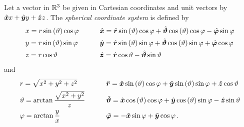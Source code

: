 \begin{definition}
	\label{def:sph_coords}
	Let a vector in $\mathbb{R}^3$ be given in Cartesian coordinates and unit vectors
	by $\uv{x}x + \uv{y}y + \uv{z}z$.
	The \emph{spherical coordinate system} is defined by 
	\begin{subequations}
		\begin{align}
			&x = r \sin \left(\vartheta\right) \cos \varphi
			\qquad
			&&\uv{x} = \uv{r} \sin\left(\vartheta\right) \cos \varphi +
			\uv{\vartheta} \cos\left(\vartheta\right) \cos \varphi -
			\uv{\varphi} \sin \varphi \\
			&y = r \sin \left(\vartheta\right) \sin \varphi
			\qquad
			&&\uv{y} = \uv{r} \sin\left(\vartheta\right) \sin \varphi +
			\uv{\vartheta} \cos\left(\vartheta\right) \sin \varphi +
			\uv{\varphi} \cos \varphi \\
			&z = r \cos \vartheta
			\qquad
			&&\uv{z} = \uv{r} \cos \vartheta - \uv{\vartheta} \sin \vartheta
		\end{align}
	\end{subequations}
	and
	\begin{subequations}
		\begin{align}
			&r = \sqrt{x^2 + y^2 + z^2}
			\qquad
			&&\uv{r} =
			\uv{x} \sin \left(\vartheta\right) \cos \varphi +
			\uv{y} \sin \left(\vartheta\right) \sin \varphi +
			\uv{z} \cos \vartheta \\
			&\vartheta = \arctan \frac{\sqrt{x^2 + y^2}}{z}
			\qquad
			&&\uv{\vartheta} = 
			\uv{x} \cos \left(\vartheta\right) \cos \varphi +
			\uv{y} \cos \left(\vartheta\right) \sin \varphi -
			\uv{z} \sin \vartheta \\
			&\varphi = \arctan \frac{y}{x}
			\qquad
			&&\uv{\varphi} = 
			-\uv{x} \sin \varphi +
			\uv{y} \cos \varphi \, .
		\end{align}
	\end{subequations}
\end{definition}

